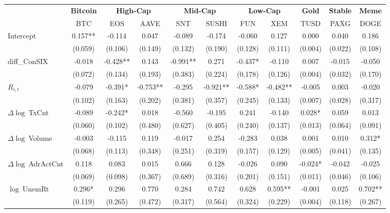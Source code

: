\begin{table}[ht]
\centering
\scriptsize
\setlength{\tabcolsep}{4pt}
\begin{tabular}{l *{10}{c}}
\toprule
&\multicolumn{1}{c}{\textbf{Bitcoin}}&\multicolumn{2}{c}{\textbf{High-Cap}}&\multicolumn{2}{c}{\textbf{Mid-Cap}}&\multicolumn{2}{c}{\textbf{Low-Cap}}&\multicolumn{1}{c}{\textbf{Gold}}&\multicolumn{1}{c}{\textbf{Stable}}&\multicolumn{1}{c}{\textbf{Meme}}\\
\addlinespace
 & BTC & EOS & AAVE & SNT & SUSHI & FUN & XEM & TUSD & PAXG & DOGE \\
\midrule
Intercept & 0.157** & -0.114 & 0.047 & -0.089 & -0.174 & -0.060 & 0.127 & 0.000 & 0.040 & 0.186 \\
 & (0.059) & (0.106) & (0.149) & (0.132) & (0.190) & (0.128) & (0.111) & (0.004) & (0.022) & (0.108) \\
\addlinespace
diff_ConSIX & -0.018 & -0.428** & 0.143 & -0.991** & 0.271 & -0.437* & -0.110 & 0.007 & -0.015 & -0.050 \\
 & (0.072) & (0.134) & (0.193) & (0.383) & (0.224) & (0.178) & (0.126) & (0.004) & (0.032) & (0.170) \\
\addlinespace
$R_{i,t}$ & -0.079 & -0.391* & -0.753** & -0.295 & -0.921** & -0.588* & -0.482** & -0.005 & 0.003 & -0.020 \\
 & (0.102) & (0.163) & (0.202) & (0.381) & (0.357) & (0.245) & (0.133) & (0.007) & (0.028) & (0.317) \\
\addlinespace
$\Delta\log\ $TxCnt & -0.089 & -0.242* & 0.018 & -0.560 & -0.195 & 0.241 & -0.140 & 0.028* & 0.059 & 0.013 \\
 & (0.060) & (0.102) & (0.480) & (0.627) & (0.405) & (0.240) & (0.137) & (0.013) & (0.064) & (0.091) \\
\addlinespace
$\Delta\log\ $Volume & -0.003 & -0.115 & 0.119 & -0.017 & 0.254 & -0.283 & 0.038 & 0.001 & 0.010 & 0.312* \\
 & (0.068) & (0.113) & (0.348) & (0.251) & (0.319) & (0.157) & (0.129) & (0.005) & (0.041) & (0.135) \\
\addlinespace
$\Delta\log\ $AdrActCnt & 0.118 & 0.083 & 0.015 & 0.666 & 0.128 & -0.026 & 0.090 & -0.024* & -0.042 & -0.025 \\
 & (0.069) & (0.098) & (0.367) & (0.689) & (0.316) & (0.201) & (0.151) & (0.011) & (0.046) & (0.106) \\
\addlinespace
$\log\ $UnemRt & 0.296* & 0.296 & 0.770 & 0.284 & 0.742 & 0.628 & 0.595** & -0.001 & 0.025 & 0.702** \\
 & (0.119) & (0.265) & (0.472) & (0.317) & (0.564) & (0.324) & (0.229) & (0.004) & (0.118) & (0.267) \\

\end{tabular}
\end{table}
